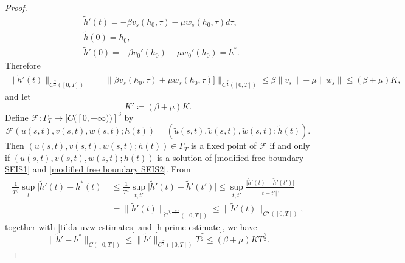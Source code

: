 \documentclass[11pt]{amsart}
\numberwithin{equation}{section}
\theoremstyle{plain}
\theoremstyle{definition}
\begin{document}
\begin{proof}
		\begin{equation*}
			\begin{aligned}
				&\widetilde h'(t)=-\beta v_s(h_0,\tau)-\mu w_s(h_0,\tau)d\tau,\\
				&\widetilde h(0)=h_0,\\
				&\widetilde h'(0)=-\beta {v_0}'(h_0)-\mu {w_0}'(h_0)=h^*.
			\end{aligned}
		\end{equation*}
		Therefore
		\begin{equation}	\label{h prime estimate}
			\begin{aligned}
			\lVert {\widetilde h}'(t) \rVert _{C^{\frac{\gamma}{2}}([0,T])}&=\lVert \beta v_s(h_0,\tau)+\mu w_s(h_0,\tau) ]\rVert_{C^\frac{\gamma}{2}([0,T])}\leq \beta \lVert v_s \rVert + \mu \lVert w_s \rVert \leq (\beta + \mu)K,
			\end{aligned}
		\end{equation}
		and let 
		\begin{equation*}
			K' \coloneqq (\beta + \mu)K.
		\end{equation*}
		Define $\mathcal{F} : \Gamma_T \to [C([0,+\infty))]^3$ by
		\begin{equation*}
			\mathcal{F}(u(s,t),v(s,t),w(s,t);h(t))=(\widetilde u(s,t),\widetilde v(s,t),\widetilde w(s,t);\widetilde h(t)).
		\end{equation*}
		Then $(u(s,t),v(s,t),w(s,t);h(t))\in \Gamma_T$ is a fixed point of $\mathcal{F}$ if and only if $(u(s,t),v(s,t),w(s,t);h(t))$ is a solution of \cref{modified free boundary SEIS1} and \cref{modified free boundary SEIS2}.
		From 
		\begin{equation*}
			\begin{aligned}
			\frac{1}{T^{\frac{\gamma}{2}}}\underset{t}{\sup}\lvert {\widetilde h}'(t)-h^*(t) \rvert &\leq \frac{1}{T^{\frac{\gamma}{2}}}\underset{t,t'}{\sup}\lvert {\widetilde h}'(t)-{\widetilde h}'(t') \rvert \leq \underset{t,t'}{\sup}\frac{\lvert{\widetilde h}'(t)-{\widetilde h}'(t')\rvert}{\lvert t-t' \rvert^{\frac{\gamma}{2}}}\\
			&=\lVert {\widetilde h}'(t) \rVert _{\dot{C}^{0,\frac{1+\gamma}{2}}([0,T])}\leq \lVert {\widetilde h}'(t) \rVert_{C^\frac{\gamma}{2}([0,T])},
			\end{aligned}
		\end{equation*}
		together with \cref{tilda uvw estimates} and \cref{h prime estimate}, we have
		\begin{equation} \label{h' holder}
			\lVert {\widetilde h}'-h^* \rVert_{C([0,T])} \leq \lVert {\widetilde h}' \rVert_{C^{\frac{\gamma}{2}}([0,T])}T^{\frac{\gamma}{2}}\leq(\beta + \mu)KT^{\frac{\gamma}{2}}.

\end{equation}
\end{proof}
\end{document}

